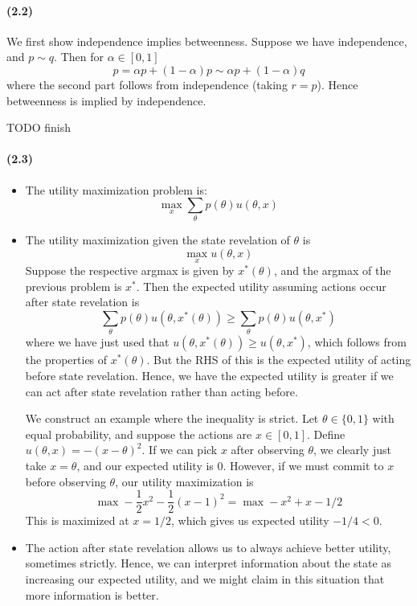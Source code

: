 \documentclass[10pt,letter]{article}
\begin{document}
\paragraph{(2.2)}
We first show independence implies betweenness. Suppose we have independence, and $p \sim q$. Then for $\alpha \in [0,1]$
\[ p = \alpha p + (1-\alpha) p \sim \alpha p + (1-\alpha) q  \]
where the second part follows from independence (taking $r = p$). Hence betweenness is implied by independence.

TODO finish
\paragraph{(2.3)}
\begin{itemize}
\item The utility maximization problem is:
\[ \max_x \sum_\theta p(\theta) u(\theta, x) \]
\item The utility maximization given the state revelation of $\theta$ is
\[ \max_x u(\theta, x) \]
Suppose the respective argmax is given by $x^*(\theta)$, and the argmax of the previous problem is $x^*$. Then the expected utility assuming actions occur after state revelation is
\[ \sum_\theta p(\theta) u(\theta, x^*(\theta)) \ge \sum_\theta p(\theta) u(\theta, x^*) \]
where we have just used that $u(\theta, x^*(\theta)) \ge u(\theta, x^*)$, which follows from the properties of $x^*(\theta)$. But the RHS of this is the expected utility of acting before state revelation. Hence, we have the expected utility is greater if we can act after state revelation rather than acting before.

We construct an example where the inequality is strict. Let $\theta \in \{ 0, 1\}$ with equal probability, and suppose the actions are $x \in [0,1]$. Define $u(\theta, x) = -(x - \theta)^2$. If we can pick $x$ after observing $\theta$, we clearly just take $x = \theta$, and our expected utility is $0$. However, if we must commit to $x$ before observing $\theta$, our utility maximization is
\[ \max -\frac{1}{2}x^2 - \frac{1}{2}(x-1)^2 = \max - x^2 + x - 1/2 \]
This is maximized at $x = 1/2$, which gives us expected utility $-1/4 < 0$.
\item The action after state revelation allows us to always achieve better utility, sometimes strictly. Hence, we can interpret information about the state as increasing our expected utility, and we might claim in this situation that more information is better.
\end{itemize}
\end{document}
